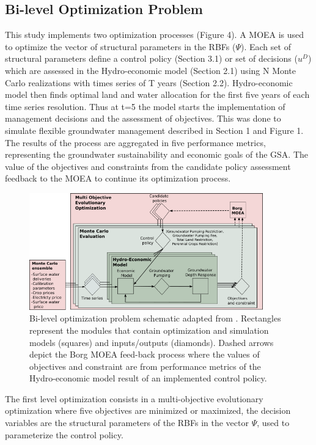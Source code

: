 \documentclass[a4paper,fleqn]{cas-sc}
\begin{document}
\subsection{Bi-level Optimization Problem}\label{sct:3.2}

This study implements two optimization processes (Figure 4). A MOEA is used to optimize the vector of structural parameters in the RBFs ($\Psi$). Each set of structural parameters define a control policy (Section 3.1) or set of decisions ($u^{D}$) which are assessed in the Hydro-economic model (Section 2.1) using N Monte Carlo realizations with times series of T years (Section 2.2). Hydro-economic model then finds optimal land and water allocation for the first five years of each time series resolution. Thus at t=5 the model starts the implementation of management decisions and the assessment of objectives. This was done to simulate flexible groundwater management described in Section 1 and Figure 1. The results of the process are aggregated in five performance metrics, representing the groundwater sustainability and economic goals of the GSA. The value of the objectives and constraints from the candidate policy assessment feedback to the MOEA to continue its optimization process. 

\begin{figure}[pos=h]
    \includegraphics[width=0.9\textwidth,center]{Diagram2}
    \caption{Bi-level optimization problem schematic adapted from \citet{hamilton_stream_2022}. Rectangles represent the modules that contain optimization and simulation models (squares) and inputs/outputs (diamonds). Dashed arrows depict the Borg MOEA feed-back process where the values of objectives and constraint are from performance metrics of the Hydro-economic model  result of an implemented control policy.}
    \label{fig:m1esh1}
\end{figure}

The first level optimization consists in a multi-objective evolutionary optimization where five objectives are minimized or maximized, the decision variables are the structural parameters of the RBFs in the vector $\Psi$, used to parameterize the control policy. 
\end{document}
